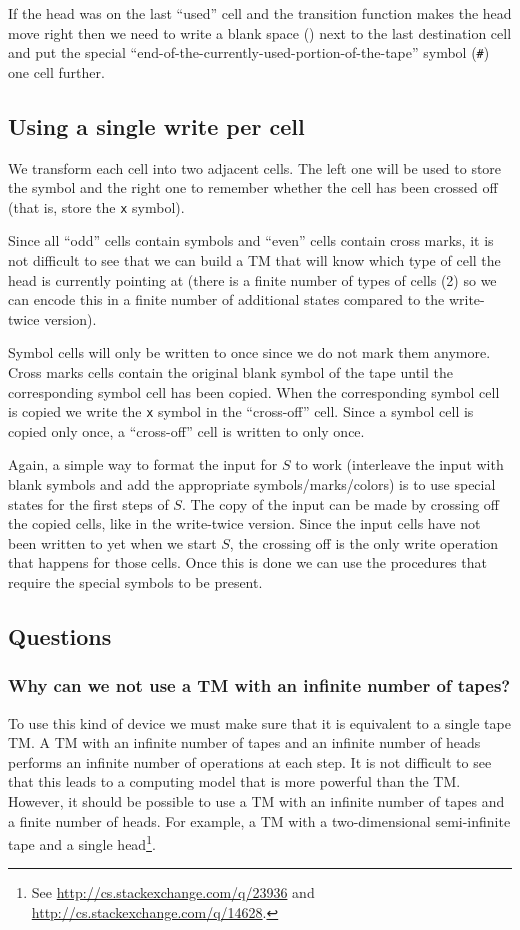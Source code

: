 \documentclass{article}
\newcommand\obullet[1]{\ThisStyle{\ensurestackMath{%
  \stackon[1pt]{\SavedStyle#1}{\SavedStyle\kern.6\LMpt\bullet}}}}
\newcommand{\blank}{\texttt{\textvisiblespace}}
\newcommand{\oblank}{\obullet{\blank}}
\newcommand{\x}{\texttt{x}}
\newcommand{\e}{\texttt{\#}}
\newcommand{\TM}{TM}
\begin{document}
If the head was on the last ``used'' cell and the transition function makes
the head move right then we need to write a blank space (\oblank{}) next to the
last destination
cell and put the special
``end-of-the-currently-used-portion-of-the-tape'' symbol (\e)
one cell further.

\subsection*{Using a single write per cell}

We transform each cell into two adjacent cells. The left one will be used to
store the symbol and the right one to remember whether the cell has been
crossed off (that is, store the \x{} symbol).

Since all ``odd'' cells contain symbols and ``even'' cells contain cross marks,
it is not difficult to see that we can build a \TM{} that will know
which type of cell the head is currently pointing at (there is a finite number
of types of cells (2) so we can encode this in a finite number of additional
states compared to the write-twice version).

Symbol cells will only be written to once since we do not mark them anymore.
Cross marks cells contain the original blank symbol of the tape until the
corresponding symbol cell has been copied. When the corresponding symbol cell
is copied we write the \x{} symbol in the ``cross-off'' cell. Since a symbol
cell is copied only once, a ``cross-off'' cell is written to only once.

Again, a simple way to format the input for \(S\) to work
(interleave the input with blank symbols and add the
appropriate symbols/marks/colors) is to use special states for the
first steps of \(S\). The copy of the input can be made by crossing off the copied
cells, like in the write-twice version. Since the input cells have not been
written to yet when we start \(S\), the crossing off is the only write
operation that happens for those cells. Once this is done we can use the
procedures that require the special symbols to be present.


\subsection*{Questions}
\subsubsection*{Why can we not use a \TM{} with an infinite number of
tapes?}
To use this kind of device we must make sure that it is equivalent to a single
tape \TM{}.
A \TM{} with an infinite number of tapes and an infinite number of heads
performs an infinite number
of operations at each step.
It is not difficult to see that this leads to a
computing model that is more powerful than the \TM{}.
However, it should be possible to use a \TM{} with an infinite number of tapes
and a finite number of heads. For example, a \TM{} with a two-dimensional
semi-infinite tape and a single head\footnote{See
\url{http://cs.stackexchange.com/q/23936}
and
\url{http://cs.stackexchange.com/q/14628}.}.
\end{document}

